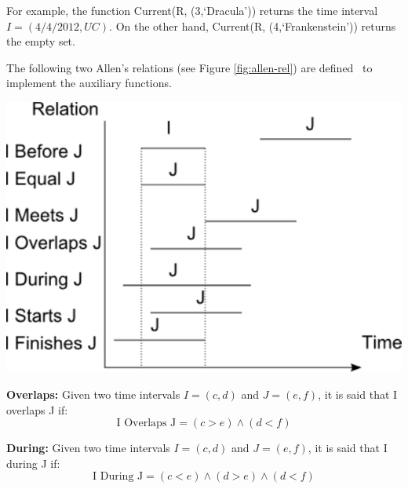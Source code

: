 For example, the function Current(R, (3,`Dracula')) returns the time interval $I = \left(4/4/2012 , UC  \right)$. On the other hand, Current(R, (4,`Frankenstein')) returns the empty set.

The following two Allen's relations (see Figure \ref{fig:allen-rel}) are defined~\cite{Nagypal2003} to implement the auxiliary functions. 



\vspace*{13pt}
\begin{center}
{
\includegraphics[scale=0.5]{./graphs/allen.pdf}

}
\end{center}
\vspace*{10pt}
\vspace*{13pt}


\begin{definition}
\textbf{Overlaps:}
 \label{def:overlaps}
Given two time intervals $I = \left(c, d \right)$ and $J = \left(e, f\right)$, it is said that I overlaps J if:
\begin{equation}
 \label{eqn:overlaps}
\text{I Overlaps J}  = \left(c > e  \right) \wedge \left(d < f  \right) 
\end{equation}
\end{definition}
  

\begin{definition}
\textbf{During:}
 \label{def:during}
Given two time intervals $I = \left(c, d \right)$ and $J = \left(e, f\right)$, it is said that I during J if:
\begin{equation}
 \label{eqn:during}
\text{I During J}  = \left(c < e  \right) \wedge \left(d > e  \right) \wedge \left(d < f \right)
\end{equation}
\end{definition}

